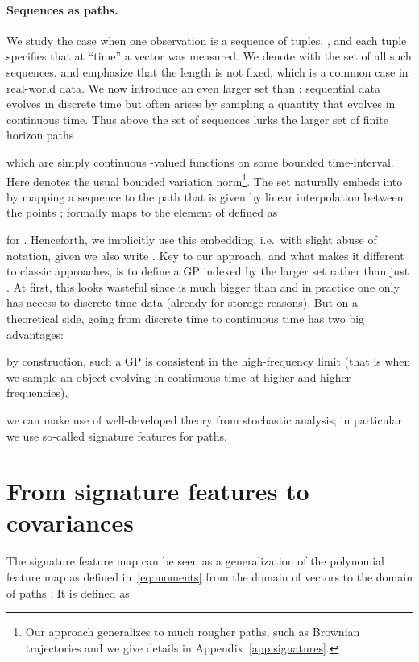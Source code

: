 \documentclass{article}
\begin{document}
\paragraph{Sequences as paths.}
We study the case when one observation  is a sequence of  tuples, , and each tuple  specifies that at ``time''  a vector  was measured.
We denote with  the set of all such sequences.
and emphasize that the length  is not fixed, which is a common case in real-world data.
We now introduce an even larger set than : 
sequential data evolves in discrete time but often arises by sampling a quantity that evolves in continuous time.
Thus above the set  of sequences lurks the larger set of finite horizon paths 

which are simply continuous -valued functions on some bounded time-interval. 
Here  denotes the usual bounded variation norm\footnote{Our approach generalizes to much rougher paths, such as Brownian trajectories and we give details in Appendix~\ref{app:signatures}.}. 
The set  naturally embeds into  by mapping a sequence  to the path that is given by linear interpolation between the points ; formally  maps to the element of  defined as
 
for .
Henceforth, we implicitly use this embedding, i.e.~with slight abuse of notation, given  we also write . 
Key to our approach, and what makes it different to classic approaches, is to define a GP indexed by the larger set  rather than just .
At first, this looks wasteful since  is much bigger than  and in practice one only has access to discrete time data (already for storage reasons).
But on a theoretical side, going from discrete time to continuous time has two big advantages:
\begin{enumerate*}[label=(\roman*)]
  \item by construction, such a GP is consistent in the high-frequency limit (that is when we sample an object evolving in continuous time at higher and higher frequencies),
  \item we can make use of well-developed theory from stochastic analysis; in particular we use so-called signature features for paths.
\end{enumerate*}
\section{From signature features to covariances}\label{sec:our GP}
The signature feature map  can be seen as a generalization of the polynomial feature map  as defined in~\eqref{eq:moments} from the domain  of vectors to the domain of paths .
It is defined as
\end{document}
